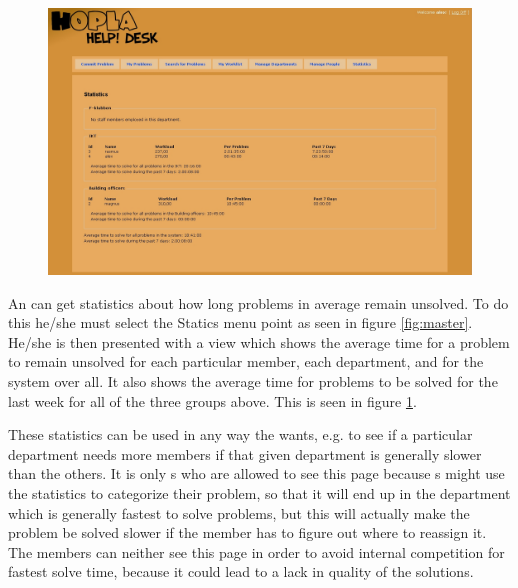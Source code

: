 \subsection{\gstat[c]}
\begin{figure}[htb]
	\centering
		\includegraphics[width=1.00\textwidth, clip=true, trim=2.9cm 2.5cm 15cm 8cm]{input/implementation/program_presentation/stat.png}
	\label{fig:stat}
\end{figure}
An \admin[] can get statistics about how long problems in average remain unsolved.
To do this he/she must select the Statics menu point as seen in figure \ref{fig:master}.
He/she is then presented with a view which shows the average time for a problem to remain unsolved for each particular \astaff[] member, each department, and for the system over all.
It also shows the average time for problems to be solved for the last week for all of the three groups above.
This is seen in figure \ref{fig:stat}.

These statistics can be used in any way the \admin[] wants, e.g. to see if a particular department needs more \astaff[] members if that given department is generally slower than the others.
It is only \admin s who are allowed to see this page because \aclient s might use the statistics to categorize their problem, so that it will end up in the department which is generally fastest to solve problems, but this will actually make the problem be solved slower if the \astaff[] member has to figure out where to reassign it.
The \astaff[] members can neither see this page in order to avoid internal competition for fastest solve time, because it could lead to a lack in quality of the solutions.



